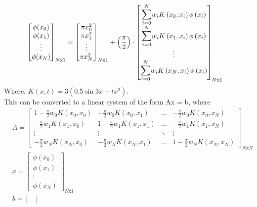 \documentclass[letterpaper]{exam}
\begin{document}
\begin{questions}
\begin{solution}
\begin{align*}
    \begin{bmatrix}
    \phi(x_0)\\
    \phi(x_1)\\
    \vdots\\
    \phi(x_N)
    \end{bmatrix}_{N\text{x}1} &=
    \begin{bmatrix}
    \pi x_0^2\\
    \pi x_1^2\\
    \vdots\\
    \pi x_N^2
    \end{bmatrix}_{N\text{x}1} +
    \left(\frac{\pi}{2}\right)\cdot 
    \begin{bmatrix}
    \overset{N}{\underset{i = 0}{\mathlarger{\mathlarger{\sum}}}} w_i K\left(x_0,x_i\right)\phi\left(x_i\right)\\
    \overset{N}{\underset{i = 0}{\mathlarger{\mathlarger{\sum}}}} w_i K\left(x_1,x_i\right)\phi\left(x_i\right)\\
    \vdots\\
    \overset{N}{\underset{i = 0}{\mathlarger{\mathlarger{\sum}}}} w_i K\left(x_N,x_i\right)\phi\left(x_i\right)
    \end{bmatrix}_{N\text{x}1}
\end{align*}
Where, $K(x,t) = 3\left(0.5\sin{3x} - tx^2\right)$.\\
This can be converted to a linear system of the form Ax = b, where
\begin{align*}
    &A = \begin{bmatrix}
    1 - \frac{\pi}{2}w_0K(x_0,x_0) & - \frac{\pi}{2}w_0K(x_0,x_1) & \ldots & - \frac{\pi}{2}w_0K(x_0,x_N)\\
     -\frac{\pi}{2}w_1K(x_1,x_0) & 1- \frac{\pi}{2}w_1K(x_1,x_1) & \ldots & - \frac{\pi}{2}w_1K(x_1,x_N)\\
     \vdots &\vdots & \ddots & \vdots \\
      -\frac{\pi}{2}w_NK(x_N,x_0) & - \frac{\pi}{2}w_NK(x_N,x_1) & \ldots & 1 - \frac{\pi}{2}w_NK(x_N,x_N)
    \end{bmatrix}_{N\text{x}N}\\
    &x = \begin{bmatrix}
    \phi(x_0)\\
    \phi(x_1)\\
    \vdots\\
    \phi(x_N)
    \end{bmatrix}_{N\text{x}1}\\
    &b = \begin{bmatrix}

\end{bmatrix}
\end{align*}
\end{solution}
\end{questions}
\end{document}
